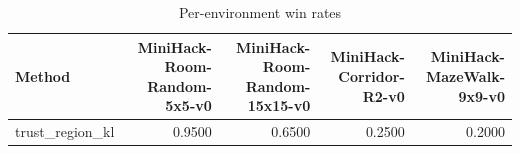 \begin{table}[htbp]
\centering
\caption{Per-environment win rates}
\label{tab:per-env}
\begin{tabular}{lrrrr}
\toprule
\textbf{Method} & \textbf{MiniHack-Room-Random-5x5-v0} & \textbf{MiniHack-Room-Random-15x15-v0} & \textbf{MiniHack-Corridor-R2-v0} & \textbf{MiniHack-MazeWalk-9x9-v0} \\
\midrule
trust\_region\_kl & 0.9500 & 0.6500 & 0.2500 & 0.2000 \\
\bottomrule
\end{tabular}
\end{table}